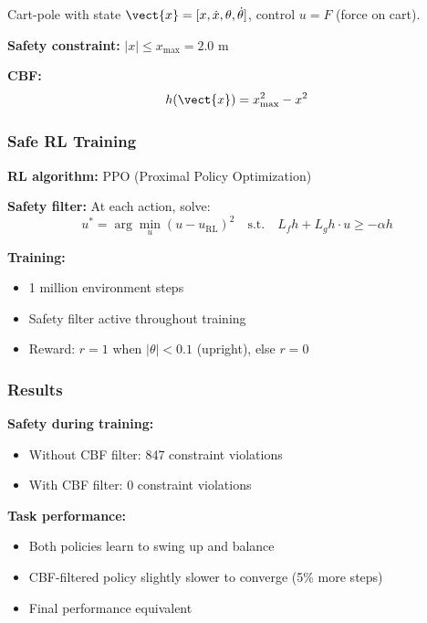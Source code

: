 Cart-pole with state $\vect{x} = [x, \dot{x}, \theta, \dot{\theta}]$, control $u = F$ (force on cart).

\textbf{Safety constraint:} $|x| \leq x_{\max} = 2.0$ m

\textbf{CBF:}
\begin{equation}
h(\vect{x}) = x_{\max}^2 - x^2
\end{equation}

\subsubsection{Safe RL Training}

\textbf{RL algorithm:} PPO (Proximal Policy Optimization)

\textbf{Safety filter:} At each action, solve:
\begin{equation}
u^* = \arg\min_u (u - u_{\text{RL}})^2 \quad \text{s.t.} \quad L_f h + L_g h \cdot u \geq -\alpha h
\end{equation}

\textbf{Training:}
\begin{itemize}
    \item 1 million environment steps
    \item Safety filter active throughout training
    \item Reward: $r = 1$ when $|\theta| < 0.1$ (upright), else $r = 0$
\end{itemize}

\subsubsection{Results}

\textbf{Safety during training:}
\begin{itemize}
    \item Without CBF filter: 847 constraint violations
    \item With CBF filter: 0 constraint violations
\end{itemize}

\textbf{Task performance:}
\begin{itemize}
    \item Both policies learn to swing up and balance
    \item CBF-filtered policy slightly slower to converge (5\% more steps)
    \item Final performance equivalent
\end{itemize}



